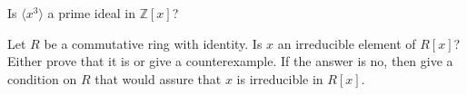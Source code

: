 \documentclass[12pt,letterpaper,boxed]{hmcpset}
\begin{document}
\begin{solution}
\end{solution}

\clearpage

\begin{problem}[18.1.6]
Is $\langle x^3 \rangle$ a prime ideal in $\mathbb{Z}[x]$? 
\end{problem}

\begin{solution}
\end{solution}

\clearpage

\begin{problem}[18.1.8]
Let $R$ be a commutative ring with identity. Is $x$ an irreducible element of $R[x]$? Either prove that it is or give a counterexample. If the answer is no, then give a condition on $R$ that would assure that $x$ is irreducible in $R[x]$.
\end{problem}

\begin{solution}
\end{solution}
\end{document}
